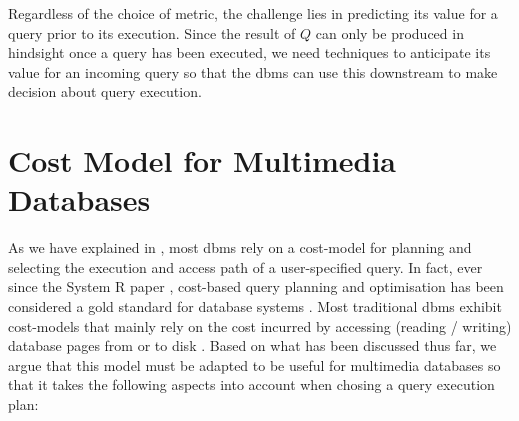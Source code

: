 Regardless of the choice of metric, the challenge lies in predicting its value for a query prior to its execution. Since the result of $Q$ can only be produced in hindsight once a query has been executed, we need techniques to anticipate its value for an incoming query so that the \acrshort{dbms} can use this downstream to make decision about query execution.

\section{Cost Model for Multimedia Databases}
\label{section:cost_model}

As we have explained in , most \acrshort{dbms} rely on a cost-model for planning and selecting the execution and access path of a user-specified query. In fact, ever since the System R paper \cite{Selinger:1979Access}, cost-based query planning and optimisation has been considered a gold standard for database systems \cite{Mannino:1988Statistical}. Most traditional \acrshort{dbms} exhibit cost-models that mainly rely on the cost incurred by accessing (reading / writing) database pages from or to disk \cite{Mannino:1988Statistical,Garcia:2009Database,Petrov:2019Database}. Based on what has been discussed thus far, we argue that this model must be adapted to be useful for multimedia databases so that it takes the following aspects into account when chosing a query execution plan:

